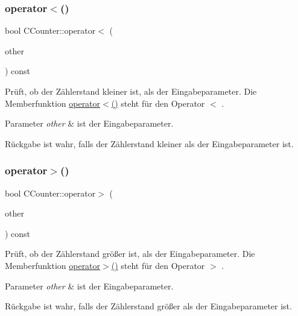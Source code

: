 \subsubsection{\texorpdfstring{operator$<$()}{operator<()}}
{\footnotesize\ttfamily bool C\+Counter\+::operator$<$ (\begin{DoxyParamCaption}\item[{const \hyperlink{class_c_counter}{C\+Counter} \&}]{other }\end{DoxyParamCaption}) const}

Prüft, ob der Zählerstand kleiner ist, als der Eingabeparameter. Die Memberfunktion \hyperlink{class_c_counter_ac43e4c4cb447d22636ac208d426d95eb}{operator$<$()} steht für den Operator $<$ . 
\begin{DoxyParams}{Parameter}
{\em other} & ist der Eingabeparameter. \\
\hline
\end{DoxyParams}
\begin{DoxyReturn}{Rückgabe}
ist wahr, falls der Zählerstand kleiner als der Eingabeparameter ist. 
\end{DoxyReturn}
\mbox{\label{class_c_counter_a23decf75e74ddfd25feb11ae6aad9c8a}} 
\subsubsection{\texorpdfstring{operator$>$()}{operator>()}}
{\footnotesize\ttfamily bool C\+Counter\+::operator$>$ (\begin{DoxyParamCaption}\item[{const \hyperlink{class_c_counter}{C\+Counter} \&}]{other }\end{DoxyParamCaption}) const}

Prüft, ob der Zählerstand größer ist, als der Eingabeparameter. Die Memberfunktion \hyperlink{class_c_counter_a23decf75e74ddfd25feb11ae6aad9c8a}{operator$>$()} steht für den Operator $>$ . 
\begin{DoxyParams}{Parameter}
{\em other} & ist der Eingabeparameter. \\
\hline
\end{DoxyParams}
\begin{DoxyReturn}{Rückgabe}
ist wahr, falls der Zählerstand größer als der Eingabeparameter ist. 
\end{DoxyReturn}
\mbox{\label{class_c_counter_ac41245afdd95c0149e99bad21696a372}} 
